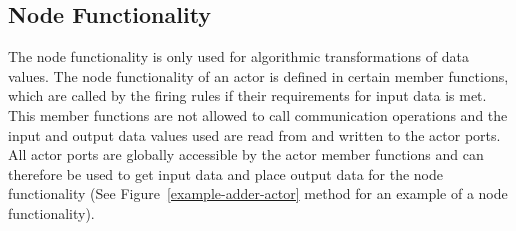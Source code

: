 %  

%  

\subsection{Node Functionality}
The node functionality is only used for algorithmic transformations of data values.
The node functionality of an actor is defined in certain member functions,
which are called by the firing rules if their requirements for input data is met.
This member functions are not allowed to call communication operations and
the input and output data values used are read from
and written to the actor ports. All actor ports are globally accessible
by the actor member functions and can therefore be used to get input data
and place output data for the node functionality
(See Figure~\ref{example-adder-actor} method  for an example of a node functionality).

